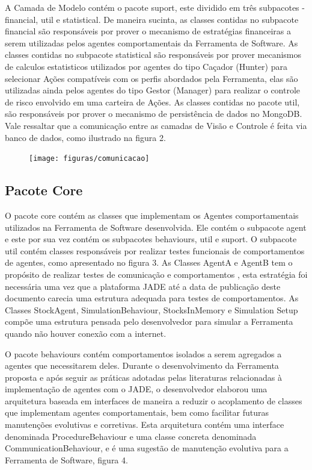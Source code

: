 \begin{apendicesenv}
A Camada de Modelo contém o pacote suport, este dividido em três subpacotes - financial, util  e statistical. De maneira sucinta,  as classes  contidas no subpacote financial são responsáveis por prover o mecanismo de estratégias financeiras a serem utilizadas pelos agentes comportamentais da Ferramenta de Software. As classes contidas no subpacote statistical são responsáveis por prover mecanismos de calculos estatisticos utilizados por agentes do tipo Caçador (Hunter) para selecionar Ações  compatíveis com os perfis abordados pela Ferramenta, elas são utilizadas ainda pelos agentes do  tipo Gestor (Manager) para realizar o controle de risco envolvido em uma carteira de Ações. As classes contidas no pacote util, são responsáveis por prover o mecanismo de persistência de dados no MongoDB. Vale ressaltar que a comunicação entre as camadas de Visão e Controle é feita via banco de dados, como ilustrado na figura 2.


\begin{figure}[h]
\centering
\label{f2}
\texttt{[image: figuras/comunicacao]}
\end{figure}

\subsection{Pacote Core}

O pacote core contém as classes que implementam os Agentes comportamentais utilizados na Ferramenta de Software desenvolvida. Ele contém o subpacote agent e este por sua vez contém  os subpacotes behaviours,  util e suport.   O subpacote util contém classes responsáveis por realizar testes funcionais de comportamentos de agentes, como apresentado no figura 3.   As Classes AgentA e AgentB tem o propósito de realizar  testes de comunicação e comportamentos , esta estratégia foi necessária uma vez que a plataforma JADE até a data de publicação deste documento carecia uma estrutura adequada para testes de comportamentos. As Classes StockAgent, SimulationBehaviour, StocksInMemory e Simulation Setup compõe uma estrutura pensada pelo desenvolvedor para simular a Ferramenta quando não houver conexão com a internet.

O pacote behaviours contém comportamentos isolados a serem agregados a agentes que necessitarem deles. Durante o desenvolvimento da Ferramenta proposta e após seguir as práticas adotadas pelas literaturas relacionadas à implementação de agentes com o JADE, o desenvolvedor elaborou uma arquitetura baseada em interfaces de maneira a reduzir o acoplamento de classes que implementam agentes comportamentais, bem como facilitar futuras manutenções evolutivas e corretivas. Esta arquitetura contém uma interface denominada ProcedureBehaviour e uma classe concreta denominada CommunicationBehaviour, e é uma sugestão de manutenção evolutiva para a Ferramenta de Software, figura 4.


\end{apendicesenv}

